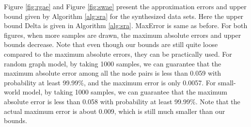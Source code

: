 \documentclass{article}
\begin{document}
Figure \ref{fig:rgae} and Figure \ref{fig:swae} present the approximation errors and upper bound given by Algorithm \ref{alg:sra} for the synthesized data sets.
Here the upper bound \textsf{Delta} is given in Algorithm \ref{alg:sra}. \textsf{MaxError} is same as before. 
For both figures, when more samples are drawn, the maximum absolute errors and upper bounds decrease. Note that even though our bounds are still quite loose compared to the maximum absolute errors, they can be practically used. For random graph model, by taking 1000 samples, we can guarantee that the maximum absolute error among all the node pairs is less than 0.059 with probability at least 99.99\%, and the maximum error is only 0.0057. For small-world model, by taking 1000 samples, we can guarantee that the maximum absolute error is less than 0.058 with probability at least 99.99\%. Note that the actual maximum error is about 0.009, which is still much smaller than our bounds.
\end{document}
